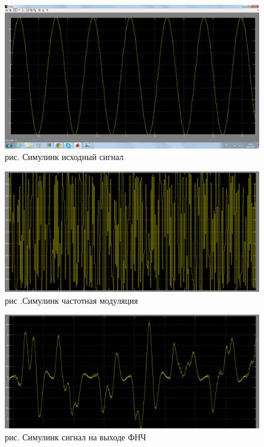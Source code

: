\documentclass[10pt,a4paper]{report}
\begin{document}
\begin{figure}
\begin{center}
\includegraphics[width=150mm, scale = 0.9]{8_8}\newline
рис. Симулинк исходный сигнал\newline
\end{center}
\end{figure}
\begin{figure}
\begin{center}
\includegraphics[width=150mm, scale = 0.9]{8_9}\newline
рис .Симулинк частотная модуляция\newline
\end{center}
\end{figure}
\begin{figure}
\begin{center}
\includegraphics[width=150mm, scale = 0.9]{8_10}\newline
рис. Симулинк сигнал на выходе ФНЧ\newline
\end{center}
\end{figure}
\end{document}
